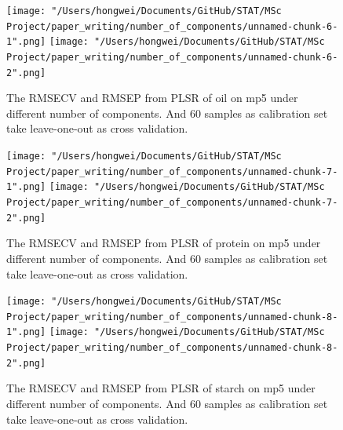\documentclass[a4paper,12pt,titlepage]{article} %
\numberwithin{equation}{section}  %
\begin{document}
\begin{appendices}
	
	
	\begin{figure}[h]    %
		\centering           %
		\texttt{[image: "/Users/hongwei/Documents/GitHub/STAT/MSc Project/paper\_writing/number\_of\_components/unnamed-chunk-6-1".png]}  %
		\texttt{[image: "/Users/hongwei/Documents/GitHub/STAT/MSc Project/paper\_writing/number\_of\_components/unnamed-chunk-6-2".png]}  %
		\caption{The RMSECV and RMSEP from PLSR of oil on mp5 under different number of components. And 60 samples as calibration set take leave-one-out as cross validation.}          %
		\label{fig:components_6-1}               %
	\end{figure}                        %
	
	
	
	\begin{figure}[h]    %
		\centering           %
		\texttt{[image: "/Users/hongwei/Documents/GitHub/STAT/MSc Project/paper\_writing/number\_of\_components/unnamed-chunk-7-1".png]}  %
		\texttt{[image: "/Users/hongwei/Documents/GitHub/STAT/MSc Project/paper\_writing/number\_of\_components/unnamed-chunk-7-2".png]}  %
		\caption{The RMSECV and RMSEP from PLSR of protein on mp5 under different number of components. And 60 samples as calibration set take leave-one-out as cross validation.}          %
		\label{fig:components_7-1}               %
	\end{figure}                        %
	
	
	
	\begin{figure}[h]    %
		\centering           %
		\texttt{[image: "/Users/hongwei/Documents/GitHub/STAT/MSc Project/paper\_writing/number\_of\_components/unnamed-chunk-8-1".png]}  %
		\texttt{[image: "/Users/hongwei/Documents/GitHub/STAT/MSc Project/paper\_writing/number\_of\_components/unnamed-chunk-8-2".png]}  %
		\caption{The RMSECV and RMSEP from PLSR of starch on mp5 under different number of components. And 60 samples as calibration set take leave-one-out as cross validation.}          %
		\label{fig:components_8-1}               %
	\end{figure}                        %
	

\end{appendices}
\end{document}
